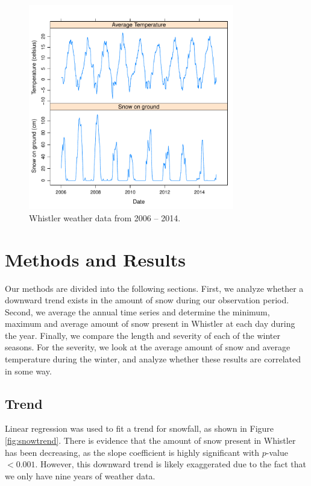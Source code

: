 \documentclass[12pt,twoside]{article}
\begin{document}
{\begin{figure}[!ht]
\begin{center}
\includegraphics[width=0.8\textwidth]{report-basicts}
\end{center}
\vspace{-5mm}
\caption{Whistler weather data from 2006 -- 2014.}
\label{fig:basicts}
\end{figure}

\section{Methods and Results}

Our methods are divided into the following sections. First, we analyze whether a downward trend exists in the amount of snow during our observation period. Second, we average the annual time series and determine the minimum, maximum and average amount of snow present in Whistler at each day during the year. Finally, we compare the length and severity of each of the winter seasons. For the severity, we look at the average amount of snow and average temperature during the winter, and analyze whether these results are correlated in some way.

\subsection{Trend}

Linear regression was used to fit a trend for snowfall, as shown in Figure \ref{fig:snowtrend}. There is evidence that the amount of snow present in Whistler has been decreasing, as the slope coefficient is highly significant with $p$-value $< 0.001$. However, this downward trend is likely exaggerated due to the fact that we only have nine years of weather data. 

}
\end{document}
